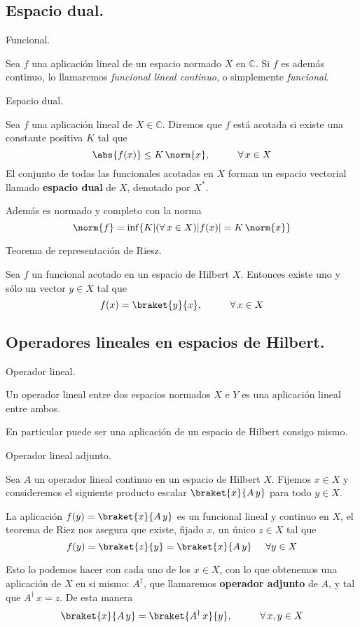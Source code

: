 \subsection{Espacio dual.}
\begin{defi} Funcional.

Sea $f$ una aplicación lineal de un espacio normado $X$ en $\mathbb{C}$. Si $f$ es además continuo, lo llamaremos \textit{funcional lineal continuo}, o simplemente \textit{funcional}.
\end{defi}
\begin{defi} Espacio dual.

Sea $f$ una aplicación lineal de $X \in \mathbb{C}$. Diremos que $f$ está acotada si existe una constante positiva $K$ tal que
\[ \abs{f(x)} \leq K \, \norm{x}, \hspace{1cm} \forall \, x \in X \]
El conjunto de todas las funcionales acotadas en $X$ forman un espacio vectorial llamado \textbf{espacio dual} de $X$, denotado por $X^{*}$.

Además es normado y completo con la norma
\[ \norm{f} = \inf \{ K \vert (\forall \, x \in X) \vert f(x) \vert = K \, \norm{x} \} \]
\end{defi}
\begin{teo} Teorema de representación de Riesz.

Sea $f$ un funcional acotado en un espacio de Hilbert $X$. Entonces existe uno y sólo un vector $y \in X$ tal que
\[ f(x) = \braket{y}{x}, \hspace{1cm} \forall \, x \in X \]
\end{teo}
\subsection{Operadores lineales en espacios de Hilbert.}
\begin{defi} Operador lineal.

Un operador lineal entre dos espacios normados $X$ e $Y$ es una aplicación lineal entre ambos.

En particular puede ser una aplicación de un espacio de Hilbert consigo mismo.
\end{defi}
\begin{defi} Operador lineal adjunto.

Sea $A$ un operador lineal continuo en un espacio de Hilbert $X$.
Fijemos $x \in X$ y consideremos el siguiente producto escalar $\braket{x}{A \, y}$ para todo $y \in X$.

La aplicación $f(y) = \braket{x}{A \, y}$ es un funcional lineal y continuo en $X$, el teorema de Riez nos asegura que existe, fijado $x$, un único $z \in X$ tal que
\[ f(y) = \braket{z}{y} = \braket{x}{A \, y} \hspace{0.5cm} \forall y \in X \]

Esto lo podemos hacer con cada uno de los $x \in X$, con lo que obtenemos una aplicación de $X$ en si mismo: $A^{\dagger}$, que llamaremos \textbf{operador adjunto} de $A$, y tal que $A^{\dagger} \, x = z$. De esta manera
\[ \braket{x}{A \, y} = \braket{A^{\dagger} \, x}{y}, \hspace{1cm} \forall \, x, y \in X \]
\end{defi}
